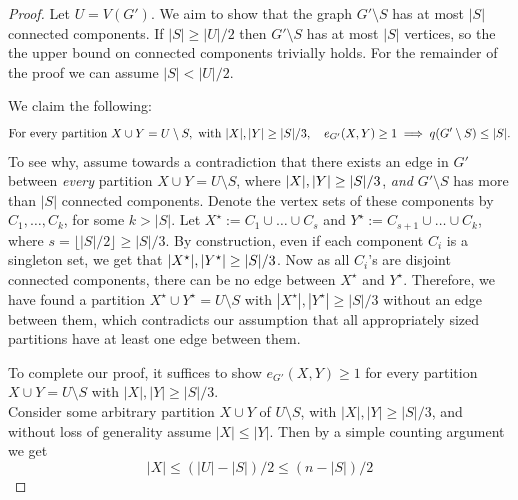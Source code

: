 \documentclass[11pt]{article}
\begin{document}
\begin{proof}
  Let $U = V(G')$.  We aim to show that the graph $G' \setminus S$ has at most $|S|$ connected components. If $|S| \ge |U|/2$ then $G' \setminus S$ has at most $|S|$ vertices, so the the upper bound on connected components trivially holds. For the remainder of the proof we can assume $|S| < |U|/2$.

  \noindent
  We claim the following:
\begin{equation}
  \text{For every partition } X \cup Y = U \setminus S,\text{ with } |X|,|Y| \ge |S|/3,
  \quad
  \CutEdges{X}{Y}{G'} \ge 1 \implies  q(G' \setminus S) \le |S|.
\label{eq:mini-claim}
\end{equation}
\flushleft
To see why, assume towards a contradiction that there exists an edge in $G'$ between \emph{every} partition $X \cup Y = U \setminus S$, where $|X|, |Y| \ge \Size{S}/3$, \emph{and} $G' \setminus S$ has more than $|S|$ connected components. Denote the  vertex sets of these components by $C_1, \ldots, C_k$, for some $k > |S|$.
Let $X^\star := C_1 \cup \ldots \cup C_{s}$ and $Y^\star := C_{s+1} \cup \ldots \cup C_{k}$, where $s = \lfloor |S|/2 \rfloor \ge |S|/3$.
By construction, even if each component $C_i$ is a singleton set, we get that  $\Size{X^\star}, \Size{Y^\star} \ge \Size{S}/3$.
Now as all $C_i$'s are disjoint connected components, there can be no edge between $X^\star$ and $Y^\star$. Therefore, we have found a partition $X^\star \cup Y^\star = U \setminus S$ with $|X^\star|, |Y^\star| \ge |S|/3$ without an edge between them, which contradicts our assumption that all appropriately sized partitions have at least one edge between them.

To complete our proof, it suffices to show $e_{G'}(X, Y) \geq 1$ for every partition $X \cup Y = U \setminus S$ with $|X|, |Y| \ge |S|/3$.\\
\flushleft
Consider some arbitrary partition $X \cup Y$ of $U \setminus S$, with $|X|, |Y| \ge |S|/3$, and without loss of generality assume $|X| \le |Y|$. 
Then by a simple counting argument we get
\begin{equation}
|X| \le (|U| - |S|)/2 \le (n - |S|)/2  \label{eq:upp-X}
\end{equation}


\end{proof}
\end{document}
